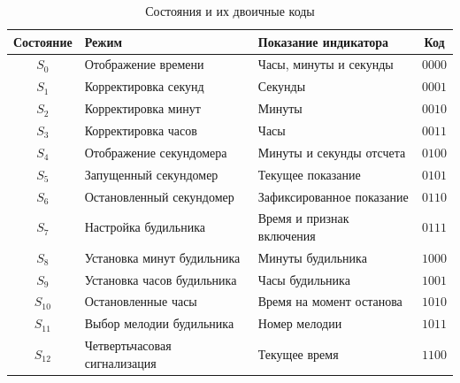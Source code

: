 \begin{table}[H]
	\centering
	\caption{Состояния и их двоичные коды}
	\label{tab:states}
	\small{}
	\renewcommand{\arraystretch}{1.12}
	\begin{tabularx}{\textwidth}{|c|>{\raggedright\arraybackslash}p{6.2cm}|>{\raggedright\arraybackslash}X|c|}
		\hline
		Состояние & Режим & Показание индикатора & Код \\
		\hline
		$S_0$ & Отображение времени & Часы, минуты и секунды & $0000$ \\
		$S_1$ & Корректировка секунд & Секунды & $0001$ \\
		$S_2$ & Корректировка минут & Минуты & $0010$ \\
		$S_3$ & Корректировка часов & Часы & $0011$ \\
		$S_4$ & Отображение секундомера & Минуты и секунды отсчета & $0100$ \\
		$S_5$ & Запущенный секундомер & Текущее показание & $0101$ \\
		$S_6$ & Остановленный секундомер & Зафиксированное показание & $0110$ \\
		$S_7$ & Настройка будильника & Время и признак включения & $0111$ \\
		$S_8$ & Установка минут будильника & Минуты будильника & $1000$ \\
		$S_9$ & Установка часов будильника & Часы будильника & $1001$ \\
		$S_{10}$ & Остановленные часы & Время на момент останова & $1010$ \\
		$S_{11}$ & Выбор мелодии будильника & Номер мелодии & $1011$ \\
		$S_{12}$ & Четвертьчасовая сигнализация & Текущее время & $1100$ \\
		\hline
	\end{tabularx}
\end{table}

